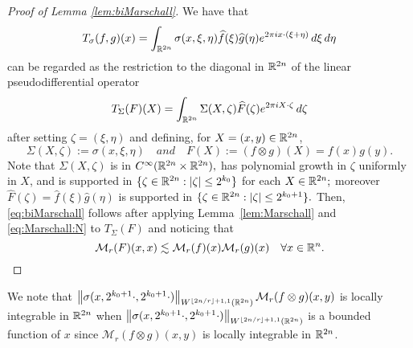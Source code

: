 \begin{proof}[Proof of Lemma \ref{lem:biMarschall}]
 We have that
$$
T_{\sigma}(f,g)(x) = \int_{\mathbb{R}^{2n}} \sigma(x, \xi, \eta) \widehat{f}(\xi) \widehat{g}(\eta) e^{2\pi i x \cdot (\xi + \eta)}\, d\xi\, d\eta
$$
can be regarded as the restriction to the diagonal in $\mathbb{R}^{2n}$ of the linear pseudodifferential operator
$$
T_\Sigma(F)(X) = \int_{\mathbb{R}^{2n}} \Sigma(X, \zeta) \widehat{F}(\zeta) e^{2\pi i X \cdot \zeta } \, d\zeta
$$
after setting $\zeta=(\xi, \eta)$ and defining, for $X = (x, y) \in \mathbb{R}^{2n}$, 
$$
\Sigma(X, \zeta) :=\sigma(x, \xi, \eta)\quad and \quad F(X):= (f\otimes g) (X)=f(x)g(y).
$$
Note that $\Sigma(X, \zeta)$ is in $C^\infty(\mathbb{R}^{2n}\times \mathbb{R}^{2n}),$  has polynomial growth in $\zeta$ uniformly in $X$, and  is supported in $\{\zeta\in\mathbb{R}^{2n}: \left\vert \zeta \right\vert\le 2^{k_0}\}$ for each $X\in \mathbb{R}^{2n};$ moreover $\widehat{F}(\zeta) =  \widehat{f}(\xi) \widehat{g}(\eta)$ is supported in $\{\zeta \in \mathbb{R}^{2n}: |\zeta| \leq 2^{k_0+1} \}.$ Then, \eqref{eq:biMarschall} follows after applying Lemma~\ref{lem:Marschall}  and \eqref{eq:Marschall:N} to $T_{\Sigma}(F)$ and noticing that 
\[
\mathcal{M}_r(F)(x, x)\lesssim \mathcal{M}_r(f)(x)\mathcal{M}_r(g)(x)\quad \forall x\in{{\mathbb R}^n}.
\]
\end{proof}

\begin{remark}\label{remark:locint}
We note that $\left\|\sigma(x, 2^{k_0+1} \cdot, 2^{k_0+1} \cdot)\right\|_{W^{\lfloor{2n/r}\rfloor + 1,1}(\mathbb{R}^{2n})} \mathcal{M}_r(f\otimes g)(x,y) $ is locally integrable in $\mathbb{R}^{2n}$ when $\left\|\sigma(x, 2^{k_0+1} \cdot, 2^{k_0+1} \cdot)\right\|_{W^{\lfloor{2n/r}\rfloor + 1,1}(\mathbb{R}^{2n})}$ is a bounded function of $x$ since $\mathcal{M}_r(f\otimes g)(x,y)$ is locally integrable in $\mathbb{R}^{2n}$.
\end{remark}


